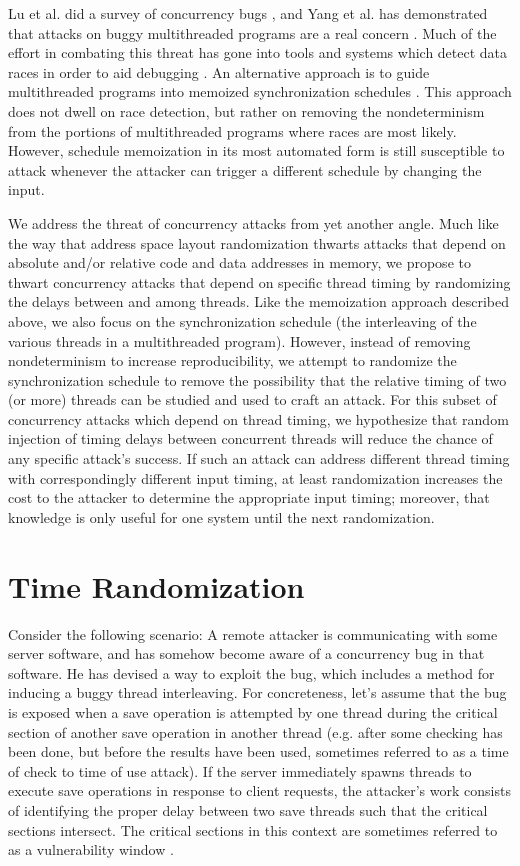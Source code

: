 \documentclass[letterpaper,twocolumn,10pt]{article}
\begin{document}
Lu et al. did a survey of concurrency bugs \cite{Lu2008}, and Yang et al. has demonstrated that attacks on buggy multithreaded programs are a real concern \cite{Yang2011}.  Much of the effort in combating this threat has gone into tools and systems which detect data races in order to aid debugging \cite{Savage1997, Flanagan2004, Laadan2011, Pratikakis2011, Kasikci2013}.  An alternative approach is to guide multithreaded programs into memoized synchronization schedules \cite{Cui2011}.  This approach does not dwell on race detection, but rather on removing the nondeterminism from the portions of multithreaded programs where races are most likely.  However, schedule memoization in its most automated form is still susceptible to attack whenever the attacker can trigger a different schedule by changing the input.

We address the threat of concurrency attacks from yet another angle.  Much like the way that address space layout randomization thwarts attacks that depend on absolute and/or relative code and data addresses in memory, we propose to thwart concurrency attacks that depend on specific thread timing by randomizing the delays between and among threads.  Like the memoization approach described above, we also focus on the synchronization schedule (the interleaving of the various threads in a multithreaded program).  However, instead of removing nondeterminism to increase reproducibility, we attempt to randomize the synchronization schedule to remove the possibility that the relative timing of two (or more) threads can be studied and used to craft an attack.  For this subset of concurrency attacks which depend on thread timing, we hypothesize that random injection of timing delays between concurrent threads will reduce the chance of any specific attack's success.  If such an attack can address different thread timing with correspondingly different input timing, at least randomization increases the cost to the attacker to determine the appropriate input timing; moreover, that knowledge is only useful for one system until the next randomization.

\section{Time Randomization}
Consider the following scenario: A remote attacker is communicating with some server software, and has somehow become aware of a concurrency bug in that software.  He has devised a way to exploit the bug, which includes a method for inducing a buggy thread interleaving.  For concreteness, let's assume that the bug is exposed when a save operation is attempted by one thread during the critical section of another save operation in another thread (e.g. after some checking has been done, but before the results have been used, sometimes referred to as a time of check to time of use attack).  If the server immediately spawns threads to execute save operations in response to client requests, the attacker's work consists of identifying the proper delay between two save threads such that the critical sections intersect.  The critical sections in this context are sometimes referred to as a vulnerability window \cite{Yang2011}.
\end{document}
